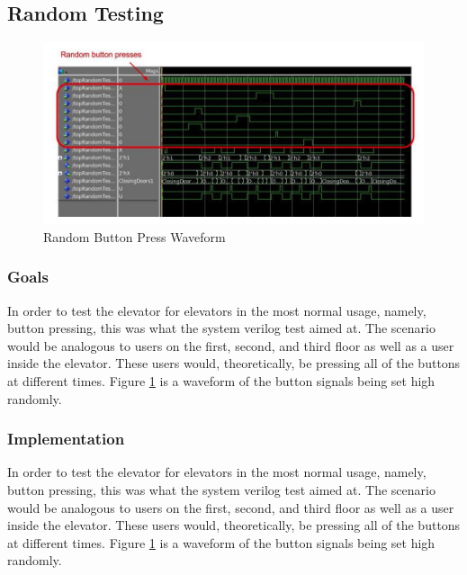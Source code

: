 \documentclass[journal]{IEEEtran}
\begin{document}
\subsection{Random Testing}

\begin{figure}[t]
\centering
\includegraphics[width=0.9\linewidth]{RandomButtonTestWaveform}
\caption{Random Button Press Waveform}
\label{bttn_press_waveform}
\end{figure}

\subsubsection{Goals}
In order to test the elevator for elevators in the most normal usage, namely, button pressing, this was what the system verilog test aimed at. The scenario would be analogous to users on the first, second, and third floor as well as a user inside the elevator. These users would, theoretically, be pressing all of the buttons at different times. Figure \ref{bttn_press_waveform} is a waveform of the button signals being set high randomly.

\subsubsection{Implementation}
In order to test the elevator for elevators in the most normal usage, namely, button pressing, this was what the system verilog test aimed at. The scenario would be analogous to users on the first, second, and third floor as well as a user inside the elevator. These users would, theoretically, be pressing all of the buttons at different times. Figure \ref{bttn_press_waveform} is a waveform of the button signals being set high randomly.
\end{document}
